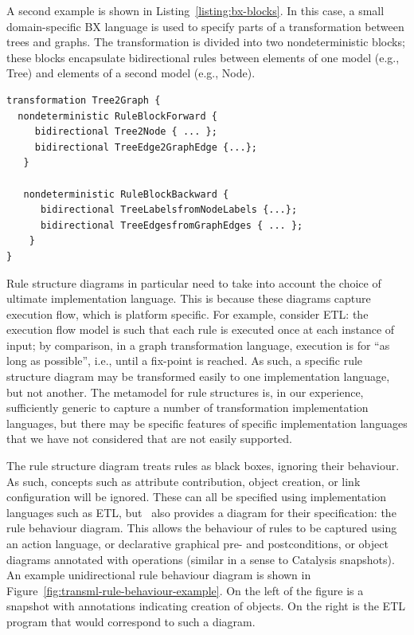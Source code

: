 A second example is shown in Listing~\ref{listing:bx-blocks}. In this case, a small domain-specific BX language is used to specify parts of a transformation between trees and graphs. The transformation is divided into two nondeterministic blocks; these blocks encapsulate bidirectional rules between elements of one model (e.g., Tree) and elements of a second model (e.g., Node). 

\begin{lstlisting}[caption=An example of a BX using blocks, label=listing:bx-blocks]
transformation Tree2Graph {
  nondeterministic RuleBlockForward {
     bidirectional Tree2Node { ... };
     bidirectional TreeEdge2GraphEdge {...};
   }
   
   nondeterministic RuleBlockBackward {
      bidirectional TreeLabelsfromNodeLabels {...};
      bidirectional TreeEdgesfromGraphEdges { ... };
    }
}
\end{lstlisting}
Rule structure diagrams in particular need to take into account the choice of ultimate implementation language. This is because these diagrams capture execution flow, which is platform specific. For example, consider ETL: the execution flow model is such that each rule is executed once at each instance of input; by comparison, in a graph transformation language, execution is for ``as long as possible'', i.e., until a fix-point is reached. As such, a specific rule structure diagram may be transformed easily to one implementation language, but not another. The metamodel for rule structures is, in our experience, sufficiently generic to capture a number of transformation implementation languages, but there may be specific features of specific implementation languages that we have not considered that are not easily supported.

The rule structure diagram treats rules as black boxes, ignoring their behaviour. As such, concepts such as attribute contribution, object creation, or link configuration will be ignored. These can all be specified using implementation languages such as ETL, but \transml\ also provides a diagram for their specification: the rule behaviour diagram. This allows the behaviour of rules to be captured using an action language, or declarative graphical pre- and postconditions, or object diagrams annotated with operations (similar in a sense to Catalysis snapshots). An example unidirectional rule behaviour diagram is shown in Figure~\ref{fig:transml-rule-behaviour-example}. On the left of the figure is a snapshot with annotations indicating creation of objects. On the right is the ETL program that would correspond to such a diagram.

